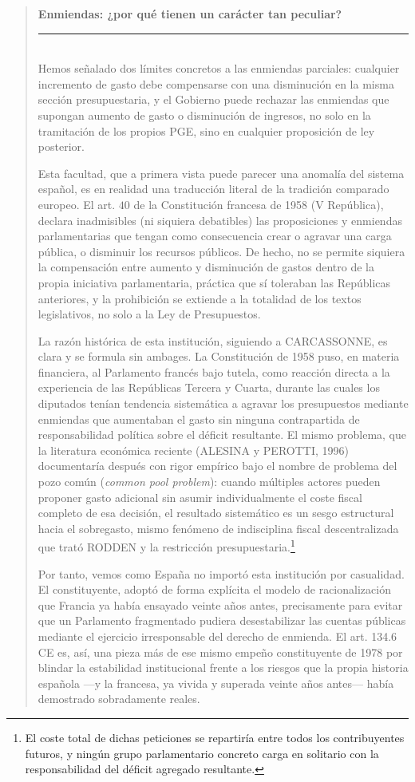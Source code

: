\documentclass[10pt,a4paper]{article}
\newenvironment{specialblock}[1]{%
      \begin{quote} %
      \small %
      \noindent\textbf{#1}\\[-0.3em] %
      \rule{\linewidth}{0.4pt}\\[0.6em]}{
      \end{quote}}
\begin{document}
\begin{specialblock}{\textbf{Enmiendas:} ¿por qué tienen un carácter tan peculiar?}
    Hemos señalado dos límites concretos a las enmiendas parciales: cualquier incremento de gasto debe compensarse con una disminución en la misma sección presupuestaria, y el Gobierno puede rechazar las enmiendas que supongan aumento de gasto o disminución de ingresos, no solo en la tramitación de los propios PGE, sino en cualquier proposición de ley posterior.

    Esta facultad, que a primera vista puede parecer una anomalía del sistema español, es en realidad una traducción literal de la tradición comparado europeo. El art. $40$ de la Constitución francesa de 1958 (V República), declara inadmisibles (ni siquiera debatibles) las proposiciones y enmiendas parlamentarias que tengan como consecuencia crear o agravar una carga pública, o disminuir los recursos públicos. De hecho, no se permite siquiera la compensación entre aumento y disminución de gastos dentro de la propia iniciativa parlamentaria, práctica que sí toleraban las Repúblicas anteriores, y la prohibición se extiende a la totalidad de los textos legislativos, no solo a la Ley de Presupuestos.
    
    La razón histórica de esta institución, siguiendo a CARCASSONNE, es clara y se formula sin ambages. La Constitución de 1958 puso, en materia financiera, al Parlamento francés bajo tutela, como reacción directa a la experiencia de las Repúblicas Tercera y Cuarta, durante las cuales los diputados tenían tendencia sistemática a agravar los presupuestos mediante enmiendas que aumentaban el gasto sin ninguna contrapartida de responsabilidad política sobre el déficit resultante. El mismo problema, que la literatura económica reciente (ALESINA y PEROTTI, 1996) documentaría después con rigor empírico bajo el nombre de problema del pozo común (\textit{common pool problem}): cuando múltiples actores pueden proponer gasto adicional sin asumir individualmente el coste fiscal completo de esa decisión, el resultado sistemático es un sesgo estructural hacia el sobregasto, mismo fenómeno de indisciplina fiscal descentralizada que trató RODDEN y la restricción presupuestaria.\footnote{%
        El coste total de dichas peticiones se repartiría entre todos los contribuyentes futuros, y ningún grupo parlamentario concreto carga en solitario con la responsabilidad del déficit agregado resultante.
    }
    
    Por tanto, vemos como España no importó esta institución por casualidad. El constituyente, adoptó de forma explícita el modelo de racionalización que Francia ya había ensayado veinte años antes, precisamente para evitar que un Parlamento fragmentado pudiera desestabilizar las cuentas públicas mediante el ejercicio irresponsable del derecho de enmienda. El art. 134.6 CE es, así, una pieza más de ese mismo empeño constituyente de 1978 por blindar la estabilidad institucional frente a los riesgos que la propia historia española —y la francesa, ya vivida y superada veinte años antes— había demostrado sobradamente reales.


\end{specialblock}
\end{document}
